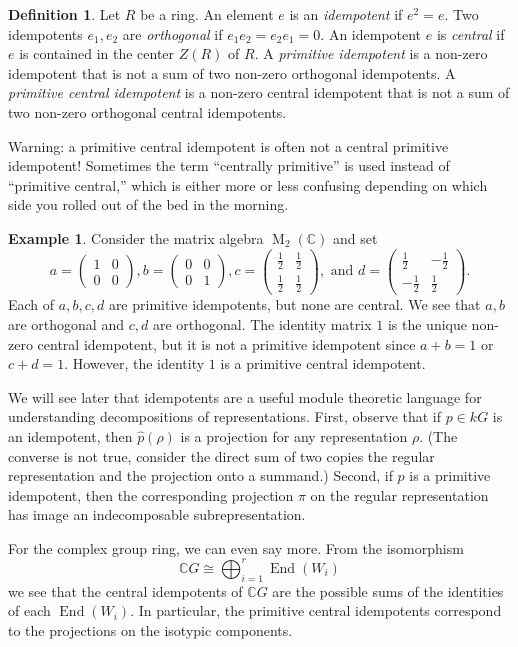 \documentclass[12pt]{article}
\theoremstyle{plain}
\theoremstyle{definition}
\newtheorem{definition}[theorem]{Definition}
\newtheorem{example}[theorem]{Example}
\theoremstyle{remark}
\numberwithin{equation}{section}
\begin{document}
\begin{definition}
Let $R$ be a ring.  An element $e$ is an \emph{idempotent} if $e^2=e$.
Two idempotents $e_1,e_2$ are \emph{orthogonal} if $e_1e_2=e_2e_1=0$.
An idempotent $e$ is \emph{central} if $e$ is contained in the center
$Z(R)$ of $R$.
A \emph{primitive idempotent} is a non-zero idempotent
that is not a sum of two non-zero orthogonal idempotents.
A \emph{primitive central idempotent} is a non-zero central idempotent
that is not a sum of two non-zero orthogonal central idempotents.
\end{definition}

Warning: a primitive central idempotent is often not a central primitive
idempotent!  Sometimes the term ``centrally primitive'' is used
instead of ``primitive central,'' which is either more or less confusing
depending on which side you rolled out of the bed in the morning.

\begin{example}
Consider the matrix algebra $\operatorname{M}_2(\mathbb{C})$
and set
\[
a = \begin{pmatrix} 1 & 0 \\ 0 & 0 \end{pmatrix},
b = \begin{pmatrix} 0 & 0 \\ 0 & 1 \end{pmatrix},
c = \begin{pmatrix} \frac{1}{2} & \frac{1}{2} \\ \frac{1}{2} & \frac{1}{2} \end{pmatrix},
\textrm{ and }
d = \begin{pmatrix} \frac{1}{2} & -\frac{1}{2} \\ -\frac{1}{2} &
\frac{1}{2} \end{pmatrix}.
\]
Each of $a,b,c,d$ are primitive idempotents, but none are central.
We see that $a,b$ are orthogonal and $c,d$ are orthogonal.
The identity matrix $1$ is the unique non-zero central idempotent,
but it is not a primitive idempotent since $a+b=1$ or $c+d=1$.
However, the identity $1$ is a primitive central idempotent.
\end{example}

We will see later that idempotents are a useful module theoretic
language for understanding decompositions of representations.
First, observe that if $p \in kG$ is an idempotent,
then $\widehat{p}(\rho)$ is a projection for any representation $\rho$.
(The converse is not true, consider the direct sum of two copies the regular
representation and the projection onto a summand.)
Second, if $p$ is a primitive idempotent, then the corresponding
projection $\pi$ on the regular representation has image an
indecomposable subrepresentation.

For the complex group ring, we can even say more.
From the isomorphism
\[
\mathbb{C}G \cong \bigoplus_{i=1}^r \operatorname{End}(W_i)
\]
we see that the central idempotents of $\mathbb{C}G$
are the possible sums of the identities of each
$\operatorname{End}(W_i)$.
In particular, the primitive central idempotents correspond
to the projections on the isotypic components.



\end{document}
